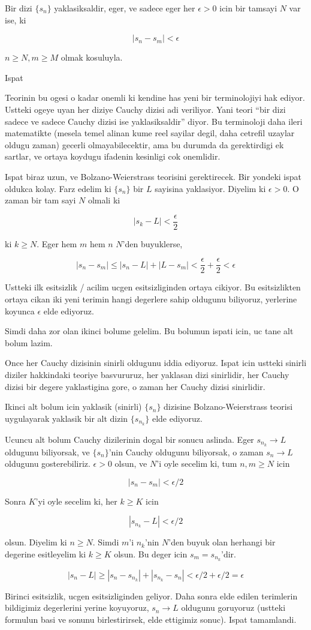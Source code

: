 \documentclass[12pt,fleqn]{article}
\begin{document}
Bir dizi $\{s_n\}$ yaklasiksaldir, eger, ve sadece eger her $\epsilon > 0$
icin bir tamsayi $N$ var ise, ki 

\[ |s_n - s_m| < \epsilon \]

$n \ge N, m \ge M$ olmak kosuluyla. 

Ispat

Teorinin bu ogesi o kadar onemli ki kendine has yeni bir terminolojiyi hak
ediyor. Ustteki ogeye uyan her diziye Cauchy dizisi adi veriliyor. Yani
teori ``bir dizi sadece ve sadece Cauchy dizisi ise yaklasiksaldir''
diyor. Bu terminoloji daha ileri matematikte (mesela temel alinan kume reel
sayilar degil, daha cetrefil uzaylar oldugu zaman) gecerli
olmayabilecektir, ama bu durumda da gerektirdigi ek sartlar, ve ortaya
koydugu ifadenin kesinligi cok onemlidir.

Ispat biraz uzun, ve Bolzano-Weierstrass teorisini gerektirecek. Bir
yondeki ispat oldukca kolay. Farz edelim ki $\{s_n\}$ bir $L$ sayisina
yaklasiyor. Diyelim ki $\epsilon > 0$. O zaman bir tam sayi $N$ olmali ki 

\[ |s_k - L| < \frac{\epsilon}{2} \]

ki $k \ge N$. Eger hem $m$ hem $n$ $N$'den buyuklerse, 

\[ |s_n - s_m| \le |s_n - L| + |L - s_m| < 
\frac{\epsilon}{2} + \frac{\epsilon}{2} <
\epsilon
\]

Ustteki ilk esitsizlik / acilim ucgen esitsizliginden ortaya cikiyor. Bu
esitsizlikten ortaya cikan iki yeni terimin hangi degerlere sahip oldugunu
biliyoruz, yerlerine koyunca $\epsilon$ elde ediyoruz. 

Simdi daha zor olan ikinci bolume gelelim. Bu bolumun ispati icin, uc
tane alt bolum lazim. 

Once her Cauchy dizisinin sinirli oldugunu iddia ediyoruz. Ispat icin
ustteki sinirli diziler hakkindaki teoriye basvururuz, her yaklasan dizi
sinirlidir, her Cauchy dizisi bir degere yaklastigina gore, o zaman her
Cauchy dizisi sinirlidir.

Ikinci alt bolum icin yaklasik (sinirli) $\{s_n\}$ dizisine Bolzano-Weierstrass
teorisi uygulayarak yaklasik bir alt dizin $\{s_{n_k}\}$ elde ediyoruz. 

Ucuncu alt bolum Cauchy dizilerinin dogal bir sonucu aslinda. Eger
 $s_{n_k}
\to L$ oldugunu biliyorsak, ve $\{s_n\}$'nin Cauchy oldugunu biliyorsak, o
zaman $s_n \to L$ oldugunu gosterebiliriz. $\epsilon > 0$ olsun, ve $N$'i
oyle secelim ki, tum $n,m \ge N$ icin

\[ |s_n - s_m| < \epsilon/2 \]

Sonra $K$'yi oyle secelim ki, her $k \ge K$ icin

\[ |s_{n_k} - L| < \epsilon/2 \]

olsun. Diyelim ki $n \ge N$. Simdi $m$'i $n_k$'nin $N$'den buyuk olan herhangi
bir degerine esitleyelim ki $k \ge K$ olsun. Bu deger icin $s_m =
s_{n_k}$'dir. 

\[ |s_n - L| \ge |s_n - s_{n_k}| + |s_{n_k} - s_n| < 
\epsilon/2 + \epsilon/2 = \epsilon 
\]

Birinci esitsizlik, ucgen esitsizliginden geliyor. Daha sonra elde edilen
terimlerin bildigimiz degerlerini yerine koyuyoruz, $s_n \to L$ oldugunu
goruyoruz (ustteki formulun basi ve sonunu birlestirirsek, elde ettigimiz
sonuc). Ispat tamamlandi. 
\end{document}
